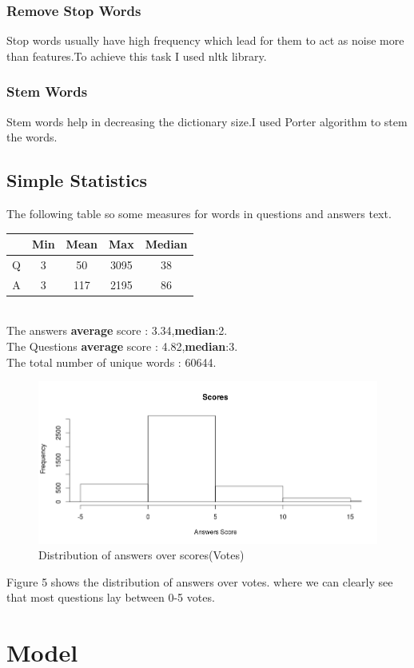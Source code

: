 \documentclass{article}
\begin{document}
\begin{multicols*}{2}
\begin{flushleft}
\subsubsection{Remove Stop Words}
Stop words usually have high frequency which lead for them to act as noise more than features.To achieve this task I used nltk library.
\subsubsection{Stem Words}
Stem words help in decreasing the dictionary size.I used Porter algorithm to stem the words.
\subsection{Simple Statistics}
The following table so some measures for words in questions and answers text.\\
\begin{tabular}{|c|c|c|c|c|}
\hline
&Min&Mean&Max&Median\\ \hline
Q&3&50&3095&38\\ \hline 
A&3&117&2195&86\\ \hline
\end{tabular}\\
\vspace{2mm}
The answers \textbf{average} score : 3.34,\textbf{median}:2.\\
The Questions \textbf{average} score : 4.82,\textbf{median}:3.\\
The total number of unique words : 60644.
\begin{figure}[H]
\includegraphics[scale=0.29]{his.png}
\caption{Distribution of answers over scores(Votes)}
\end{figure}
Figure 5 shows the distribution of answers over votes. where we can clearly see that most questions lay between 0-5 votes.
\section{Model}

\end{flushleft}
\end{multicols*}
\end{document}
